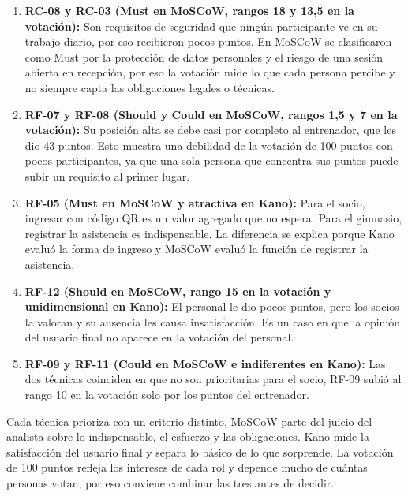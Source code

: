 \begin{enumerate}
\item \textbf{RC-08 y RC-03 (Must en MoSCoW, rangos 18 y 13,5 en la votación):} Son requisitos de seguridad que ningún participante ve en su trabajo diario, por eso recibieron pocos puntos. En MoSCoW se clasificaron como Must por la protección de datos personales y el riesgo de una sesión abierta en recepción, por eso la votación mide lo que cada persona percibe y no siempre capta las obligaciones legales o técnicas.
\item \textbf{RF-07 y RF-08 (Should y Could en MoSCoW, rangos 1,5 y 7 en la votación):} Su posición alta se debe casi por completo al entrenador, que les dio 43 puntos. Esto muestra una debilidad de la votación de 100 puntos con pocos participantes, ya que una sola persona que concentra sus puntos puede subir un requisito al primer lugar.
\item \textbf{RF-05 (Must en MoSCoW y atractiva en Kano):} Para el socio, ingresar con código QR es un valor agregado que no espera. Para el gimnasio, registrar la asistencia es indispensable. La diferencia se explica porque Kano evaluó la forma de ingreso y MoSCoW evaluó la función de registrar la asistencia.
\item \textbf{RF-12 (Should en MoSCoW, rango 15 en la votación y unidimensional en Kano):} El personal le dio pocos puntos, pero los socios la valoran y su ausencia les causa insatisfacción. Es un caso en que la opinión del usuario final no aparece en la votación del personal.
\item \textbf{RF-09 y RF-11 (Could en MoSCoW e indiferentes en Kano):} Las dos técnicas coinciden en que no son prioritarias para el socio, RF-09 subió al rango 10 en la votación solo por los puntos del entrenador.
\end{enumerate}

Cada técnica prioriza con un criterio distinto, MoSCoW parte del juicio del analista sobre lo indispensable, el esfuerzo y las obligaciones. Kano mide la satisfacción del usuario final y separa lo básico de lo que sorprende. La votación de 100 puntos refleja los intereses de cada rol y depende mucho de cuántas personas votan, por eso conviene combinar las tres antes de decidir.
